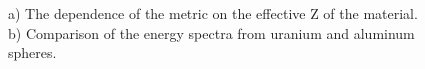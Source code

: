 \documentclass[a4paper]{panl}
\begin{document}
\begin{figure}[t]
    \begin{center}
        \begin{minipage}[h]{0.49\linewidth}
\end{minipage}
\hfill
\begin{minipage}[h]{0.49\linewidth}
\end{minipage} 
        \vspace{-3mm}
        \caption{a) The dependence of the metric on the effective Z of the material.
 b) Comparison of the energy spectra from uranium and aluminum spheres.}
    \end{center}
    \vspace{-5mm}
\end{figure}
\end{document}
